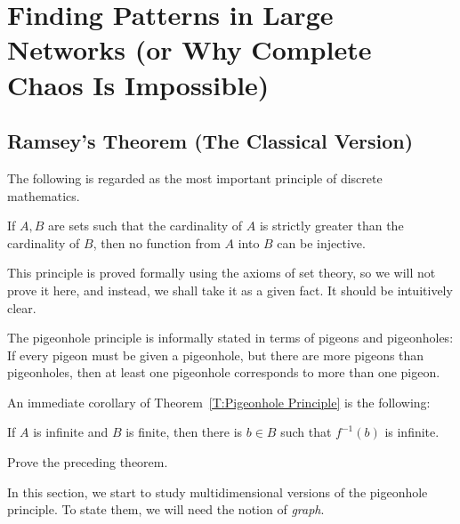 \chapter{Finding Patterns in Large Networks (or Why Complete Chaos Is Impossible)}
\label{C:Ramsey}

\section{Ramsey's Theorem (The Classical Version)}

The following is regarded as the most important principle of discrete mathematics.

\begin{theorem}
\label{T:Pigeonhole Principle}
If $A, B$ are sets such that the cardinality of $A$ is strictly greater than the cardinality of $B$, then no function from $A$ into $B$ can be injective.
\end{theorem}

This principle is proved formally using the axioms of set theory, so we will not prove it here, and instead, we shall take it as a given fact. It should be intuitively clear.

The pigeonhole principle is informally stated in terms of pigeons and pigeonholes: If every pigeon must be given a pigeonhole, but there are more pigeons than pigeonholes, then at least one pigeonhole corresponds to more than one pigeon. 

An immediate corollary of Theorem~\ref{T:Pigeonhole Principle} is the following:

\begin{theorem}
\label{T:Infinite Pigeonhole Principle}
If $A$  is infinite and $B$ is finite, then there is $b\in B$ such that $f^{-1}(b)$ is infinite.
\end{theorem}


\begin{exercise}
Prove the preceding theorem.
\end{exercise}


In this section, we start to study multidimensional versions of the pigeonhole principle. To state them, we will need the notion of \emph{graph}.




